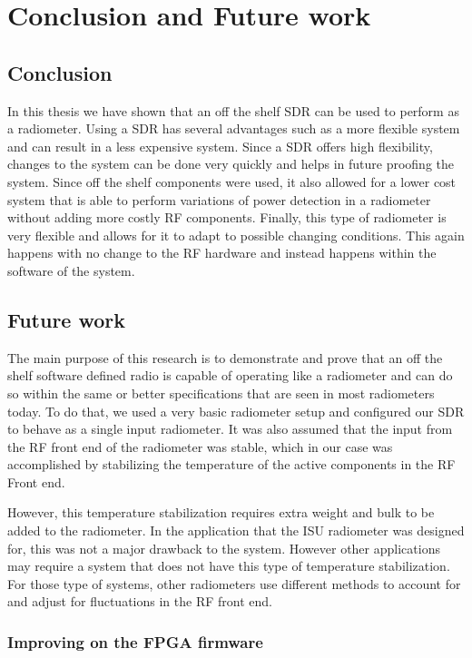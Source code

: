 \chapter{Conclusion and Future work} 

\section{Conclusion}
In this thesis we have shown that an off the shelf SDR can be used to perform as a radiometer.  Using a SDR has several advantages such as a more flexible system and can result in a less expensive system.  Since a SDR offers high flexibility, changes to the system can be done very quickly and helps in future proofing the system.  Since off the shelf components were used, it also allowed for a lower cost system that is able to perform variations of power detection in a radiometer without adding more costly RF components.  Finally, this type of radiometer is very flexible and allows for it to adapt to possible changing conditions.  This again happens with no change to the RF hardware and instead happens within the software of the system.

\section{Future work}
The main purpose of this research is to demonstrate and prove that an off the shelf software defined radio is capable of operating like a radiometer and can do so within the same or better specifications that are seen in most radiometers today.  To do that, we used a very basic radiometer setup and configured our SDR to behave as a single input radiometer.  It was also assumed that the input from the RF front end of the radiometer was stable, which in our case was accomplished by stabilizing the temperature of the active components in the RF Front end.

However, this temperature stabilization requires extra weight and bulk to be added to the radiometer.  In the application that the ISU radiometer was designed for, this was not a major drawback to the system.  However other applications may require a system that does not have this type of temperature stabilization.  For those type of systems, other radiometers use different methods to account for and adjust for fluctuations in the RF front end. 

\subsection{Improving on the FPGA firmware}

